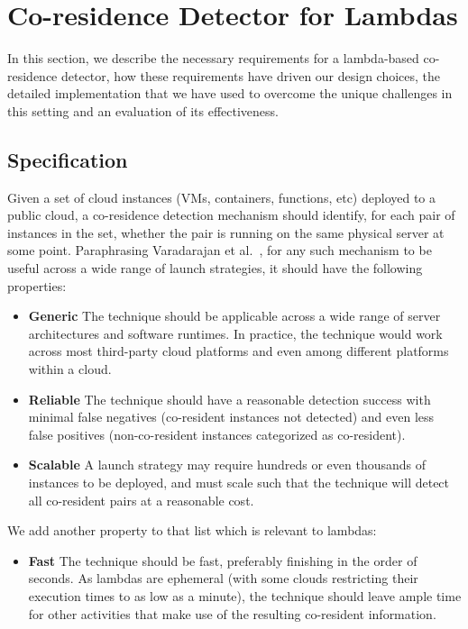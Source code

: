 

\section{Co-residence Detector for Lambdas}
\label{sec:methodology}


In this section, we describe the necessary requirements for a lambda-based 
co-residence detector, how these requirements have driven our design choices, 
the detailed implementation that we have used to overcome the unique challenges 
in this setting and an evaluation of its effectiveness.

\subsection{Specification}
Given a set of cloud instances (VMs, containers, functions, etc) deployed to a
public cloud, a co-residence detection mechanism should identify, for each pair
of instances in the set, whether the pair is running on the same physical
server at some point. Paraphrasing Varadarajan et al.~\cite{varadarajan2015},
for any such mechanism to be useful across a wide range of launch strategies, it
should have the following properties:

\begin{itemize}
    \item \textbf{Generic} The technique should be applicable across a wide
    range of server architectures and software runtimes. In practice, the
    technique would work across most third-party cloud platforms and even 
    among different platforms within a cloud.
    \item \textbf{Reliable} The technique should have a reasonable detection success
    with minimal false negatives (co-resident instances not detected) and even 
    less false positives (non-co-resident instances categorized as co-resident).
    \item \textbf{Scalable} A launch strategy may require hundreds or even
    thousands of instances to be deployed, and must scale such that the
    technique will detect all co-resident pairs at a reasonable cost.
\end{itemize}

\noindent We add another property to that list which is relevant to lambdas:
\begin{itemize}
    \item \textbf{Fast} The technique should be fast, preferably finishing in 
    the order of seconds. As lambdas are ephemeral (with some clouds restricting their 
    execution times to as low as a minute), the technique should leave ample time 
    for other activities that make use of the resulting co-resident information.
\end{itemize}


